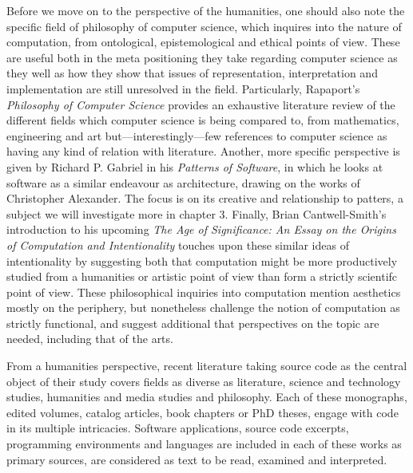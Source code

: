 Before we move on to the perspective of the humanities, one should also note the specific field of philosophy of computer science, which inquires into the nature of computation, from ontological, epistemological and ethical points of view. These are useful both in the meta positioning they take regarding computer science as they well as how they show that issues of representation, interpretation and implementation are still unresolved in the field. Particularly, Rapaport's \emph{Philosophy of Computer Science} provides an exhaustive literature review of the different fields which computer science is being compared to, from mathematics, engineering and art but—interestingly—few references to computer science as having any kind of relation with literature\cite{rapaport_philosophy_2005}. Another, more specific perspective is given by Richard P. Gabriel in his \emph{Patterns of Software}, in which he looks at software as a similar endeavour as architecture, drawing on the works of Christopher Alexander. The focus is on its creative and relationship to patters, a subject we will investigate more in chapter 3. Finally, Brian Cantwell-Smith's introduction to his upcoming \emph{The Age of Significance: An Essay on the Origins of Computation and Intentionality} touches upon these similar ideas of intentionality by suggesting both that computation might be more productively studied from a humanities or artistic point of view than form a strictly scientifc point of view\cite{smith_origin_1998}. These philosophical inquiries into computation mention aesthetics mostly on the periphery, but nonetheless challenge the notion of computation as strictly functional, and suggest additional that perspectives on the topic are needed, including that of the arts.

\vspace*{1\baselineskip}

From a humanities perspective, recent literature taking source code as the central object of their study covers fields as diverse as literature, science and technology studies, humanities and media studies and philosophy. Each of these monographs, edited volumes, catalog articles, book chapters or PhD theses, engage with code in its multiple intricacies. Software applications, source code excerpts, programming environments and languages are included in each of these works as primary sources, are considered as text to be read, examined and interpreted.

